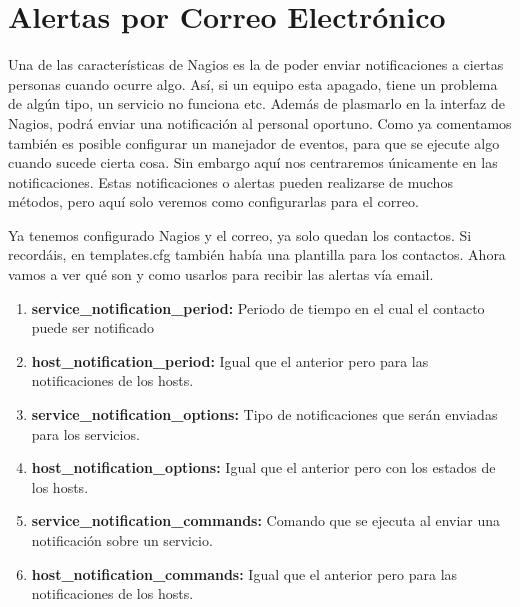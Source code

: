 \documentclass[12pt]{book}
\begin{document}
    \section{ Alertas por Correo Electrónico }
    Una de las características de Nagios es la de poder enviar notificaciones a ciertas personas cuando ocurre
    algo. Así, si un equipo esta apagado, tiene un problema de algún tipo, un servicio no funciona etc. Además
    de plasmarlo en la interfaz de Nagios, podrá enviar una notificación al personal oportuno.
    Como ya comentamos también es posible configurar un manejador de eventos, para que se ejecute algo
    cuando sucede cierta cosa. Sin embargo aquí nos centraremos únicamente en las notificaciones.
    Estas notificaciones o alertas pueden realizarse de muchos métodos, pero aquí solo veremos como
    configurarlas para el correo.
    \vspace{-5mm}
    \begin{alltt}
      
    \end{alltt}
    \vspace{-10mm}
    Ya tenemos configurado Nagios y el correo, ya solo quedan los contactos. Si recordáis, en templates.cfg
    también había una plantilla para los contactos. Ahora vamos a ver qué son y como usarlos para recibir las
    alertas vía email.
    \vspace{-5mm}
    \begin{alltt}
      
    \end{alltt}
    \vspace{-5mm}
    \begin{enumerate}
      \item {\bf service\_notification\_period: } Periodo de tiempo en el cual el contacto puede ser notificado
      \item {\bf host\_notification\_period: } Igual que el anterior pero para las notificaciones de los hosts.
      \item {\bf service\_notification\_options: } Tipo de notificaciones que serán enviadas para los servicios.
      \item {\bf host\_notification\_options: } Igual que el anterior pero con los estados de los hosts.
      \item {\bf service\_notification\_commands: } Comando que se ejecuta al enviar una notificación sobre un
      servicio.
      \item {\bf host\_notification\_commands: } Igual que el anterior pero para las notificaciones de los hosts.
    \end{enumerate}
\end{document}
